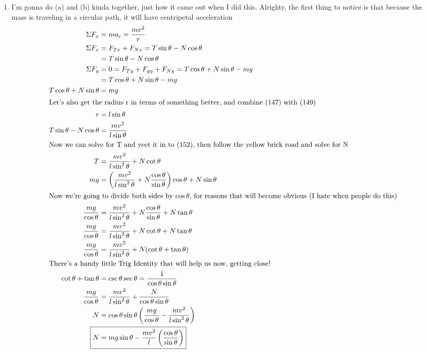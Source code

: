 \documentclass{article}
\newcommand{\sinth}{\sin{\theta}}
\newcommand{\costh}{\cos{\theta}}
\newcommand{\cotth}{\cot{\theta}}
\newcommand{\tanth}{\tan{\theta}}
\newcommand{\cscth}{\csc{\theta}}
\newcommand{\secth}{\sec{\theta}}
\begin{document}
\begin{enumerate}[label=\alph*)]
	\item %
	I'm gonna do (a) and (b) kinda together, just how it came out when I did this. Alrighty, the first thing to notice is that because the mass is traveling in a circular path, it will have centripetal acceleration
	\begin{align}
	\Sigma F_x &= ma_c = \frac{mv^2}{r} \\ 
	\Sigma F_x &= F_{Tx} + F_{Nx} = T\sin{\theta} - N\cos{\theta} \\
	&= T\sin{\theta} - N\cos{\theta} \\
	\Sigma F_y &= 0 = F_{Ty} + F_{gy} + F_{Ny} =  T\cos{\theta} + N\sin{\theta} - mg \\ 
	&=  T\cos{\theta} + N\sin{\theta} - mg \\ 
	T\cos{\theta} + N\sin{\theta} &= mg \\
	\intertext{Let's also get the radius r in terms of something better, and combine (147) with (149)}
	r &= l\sinth \\ 
	T\sin{\theta} - N\cos{\theta} &= \frac{mv^2}{l\sinth}\\ 
	\intertext{Now we can solve for T and yeet it in to (152), then follow the yellow brick road and solve for N}
	T &= \frac{mv^2}{l\sin^2{\theta}} + N\cot{\theta} \\ 
	mg &= \left( \frac{mv^2}{l\sin^2{\theta}} + N\frac{\costh}{\sinth}\right)\costh + N\sinth \\ 
	\intertext{Now we're going to divide both sides by $\costh$, for reasons that will become obvious (I hate when people do this)}
	\frac{mg}{\costh} &= \frac{mv^2}{l\sin^2{\theta}} + N\frac{\costh}{\sinth} + N\tan{\theta} \\ 
	\frac{mg}{\costh} &= \frac{mv^2}{l\sin^2{\theta}} + N\cot{\theta} + N\tan{\theta} \\
	\frac{mg}{\costh} &= \frac{mv^2}{l\sin^2{\theta}} + N(\cot{\theta} + \tan{\theta}) \\ 
	\intertext{There's a handy little Trig Identity that will help us now, getting close!}
	\cotth + \tanth &= \cscth \secth = \frac{1}{\costh \sinth} \\
	\frac{mg}{\costh} &= \frac{mv^2}{l\sin^2{\theta}} + \frac{N}{\costh \sinth} \\
	N &= \costh \sinth \left( \frac{mg}{\costh} - \frac{mv^2}{l\sin^2{\theta}} \right) \\
	\Aboxed{ N &= mg\sinth - \frac{mv^2}{l}\left( \frac{\costh}{\sinth} \right)} \\

\end{align}
\end{enumerate}
\end{document}
